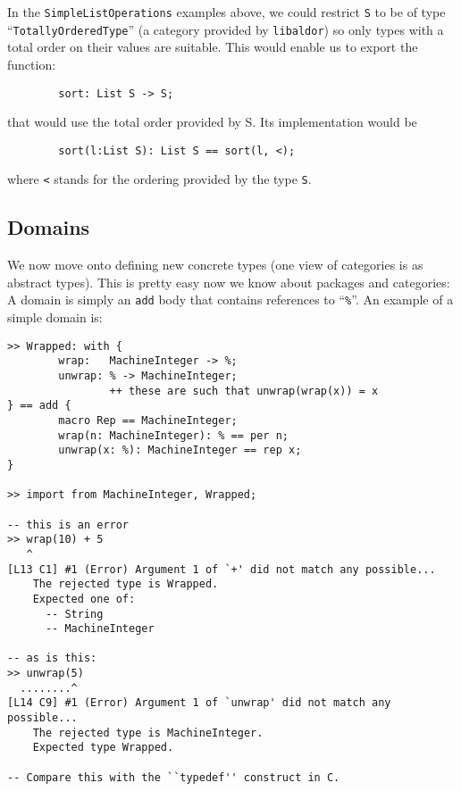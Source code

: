 \documentclass{article}
\newcommand{\libaldor}{{\tt libaldor}}
\begin{document}
In the {\tt Simple\-List\-Oper\-ations} examples above, we could
restrict {\tt S} to be of type ``{\tt Tot\-ally\-Ordered\-Type}''
(a category provided by \libaldor{}) so only types with a total order on their
values are suitable.  This would enable us to export the function:
\begin{small}
\begin{verbatim}
        sort: List S -> S;
\end{verbatim}
\end{small}
that would use the total order provided by S. Its implementation would be
\begin{small}
\begin{verbatim}
        sort(l:List S): List S == sort(l, <);
\end{verbatim}
\end{small}
where {\tt <} stands for the ordering provided by the type {\tt S}.

\subsection{Domains}

We now move onto defining new concrete types (one view of categories
is as abstract types).  This is pretty easy now we know about packages
and categories: A domain is simply an {\tt add} body that contains
references to ``\verb!%!''.  An example of a simple domain is:

\begin{small}
\begin{verbatim}
>> Wrapped: with {
        wrap:   MachineInteger -> %;
        unwrap: % -> MachineInteger;
                ++ these are such that unwrap(wrap(x)) = x
} == add {
        macro Rep == MachineInteger;
        wrap(n: MachineInteger): % == per n;
        unwrap(x: %): MachineInteger == rep x;
}

>> import from MachineInteger, Wrapped;

-- this is an error
>> wrap(10) + 5
   ^
[L13 C1] #1 (Error) Argument 1 of `+' did not match any possible...
    The rejected type is Wrapped.
    Expected one of:
      -- String
      -- MachineInteger

-- as is this:
>> unwrap(5)
  ........^
[L14 C9] #1 (Error) Argument 1 of `unwrap' did not match any possible...
    The rejected type is MachineInteger.
    Expected type Wrapped.

-- Compare this with the ``typedef'' construct in C.
\end{verbatim}
\end{small}
\end{document}
